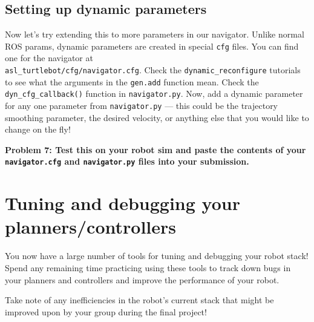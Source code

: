 \documentclass{article}
\begin{document}
\subsection{Setting up dynamic parameters}
Now let's try extending this to more parameters in our navigator. Unlike normal ROS params, dynamic parameters are created in special \texttt{cfg} files. You can find one for the navigator at \\ \texttt{asl\_turtlebot/cfg/navigator.cfg}. Check the \texttt{dynamic\_reconfigure} tutorials to see what the arguments in the \texttt{gen.add} function mean. Check the \texttt{dyn\_cfg\_callback()} function in \texttt{navigator.py}. Now, add a dynamic parameter for any one parameter from \texttt{navigator.py} --- this could be the trajectory smoothing parameter, the desired velocity, or anything else that you would like to change on the fly! 

{\bf Problem 7: Test this on your robot sim and paste the contents of your \texttt{navigator.cfg} and \texttt{navigator.py} files into your submission.}

\section{Tuning and debugging your planners/controllers}
You now have a large number of tools for tuning and debugging your robot stack! Spend any remaining time practicing using these tools to track down bugs in your planners and controllers and improve the performance of your robot.

Take note of any inefficiencies in the robot's current stack that might be improved upon by your group during the final project!
\end{document}
